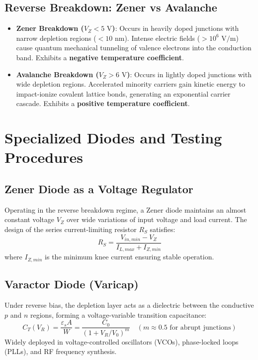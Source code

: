 \subsection{Reverse Breakdown: Zener vs Avalanche}
\begin{itemize}[leftmargin=1.5em]
    \item \textbf{Zener Breakdown ($V_Z < 5\text{ V}$)}: Occurs in heavily doped junctions with narrow depletion regions ($< 10\text{ nm}$). Intense electric fields ($> 10^6\text{ V/m}$) cause quantum mechanical tunneling of valence electrons into the conduction band. Exhibits a \textbf{negative temperature coefficient}.
    \item \textbf{Avalanche Breakdown ($V_Z > 6\text{ V}$)}: Occurs in lightly doped junctions with wide depletion regions. Accelerated minority carriers gain kinetic energy to impact-ionize covalent lattice bonds, generating an exponential carrier cascade. Exhibits a \textbf{positive temperature coefficient}.
\end{itemize}

\section{Specialized Diodes and Testing Procedures}

\subsection{Zener Diode as a Voltage Regulator}
Operating in the reverse breakdown regime, a Zener diode maintains an almost constant voltage $V_Z$ over wide variations of input voltage and load current. The design of the series current-limiting resistor $R_S$ satisfies:
\begin{equation}
R_S = \frac{V_{in,min} - V_Z}{I_{L,max} + I_{Z,min}}
\end{equation}
where $I_{Z,min}$ is the minimum knee current ensuring stable operation.

\subsection{Varactor Diode (Varicap)}
Under reverse bias, the depletion layer acts as a dielectric between the conductive $p$ and $n$ regions, forming a voltage-variable transition capacitance:
\begin{equation}
C_T(V_R) = \frac{\varepsilon_s A}{W} = \frac{C_0}{(1 + V_R / V_0)^m} \quad (m \approx 0.5 \text{ for abrupt junctions})
\end{equation}
Widely deployed in voltage-controlled oscillators (VCOs), phase-locked loops (PLLs), and RF frequency synthesis.

